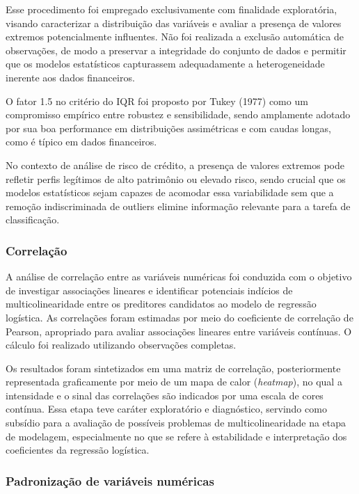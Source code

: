 \documentclass[
  brazilian,
  12pt,
  letterpaper,
  DIV=11,
  numbers=noendperiod]{scrartcl}
\begin{document}
Esse procedimento foi empregado exclusivamente com finalidade
exploratória, visando caracterizar a distribuição das variáveis e
avaliar a presença de valores extremos potencialmente influentes. Não
foi realizada a exclusão automática de observações, de modo a preservar
a integridade do conjunto de dados e permitir que os modelos
estatísticos capturassem adequadamente a heterogeneidade inerente aos
dados financeiros.

O fator 1.5 no critério do IQR foi proposto por Tukey (1977) como um
compromisso empírico entre robustez e sensibilidade, sendo amplamente
adotado por sua boa performance em distribuições assimétricas e com
caudas longas, como é típico em dados financeiros.

No contexto de análise de risco de crédito, a presença de valores
extremos pode refletir perfis legítimos de alto patrimônio ou elevado
risco, sendo crucial que os modelos estatísticos sejam capazes de
acomodar essa variabilidade sem que a remoção indiscriminada de outliers
elimine informação relevante para a tarefa de classificação.

\subsubsection{Correlação}\label{correlauxe7uxe3o}

A análise de correlação entre as variáveis numéricas foi conduzida com o
objetivo de investigar associações lineares e identificar potenciais
indícios de multicolinearidade entre os preditores candidatos ao modelo
de regressão logística. As correlações foram estimadas por meio do
coeficiente de correlação de Pearson, apropriado para avaliar
associações lineares entre variáveis contínuas. O cálculo foi realizado
utilizando observações completas.

Os resultados foram sintetizados em uma matriz de correlação,
posteriormente representada graficamente por meio de um mapa de calor
(\emph{heatmap}), no qual a intensidade e o sinal das correlações são
indicados por uma escala de cores contínua. Essa etapa teve caráter
exploratório e diagnóstico, servindo como subsídio para a avaliação de
possíveis problemas de multicolinearidade na etapa de modelagem,
especialmente no que se refere à estabilidade e interpretação dos
coeficientes da regressão logística.

\subsubsection{Padronização de variáveis
numéricas}\label{padronizauxe7uxe3o-de-variuxe1veis-numuxe9ricas}
\end{document}

